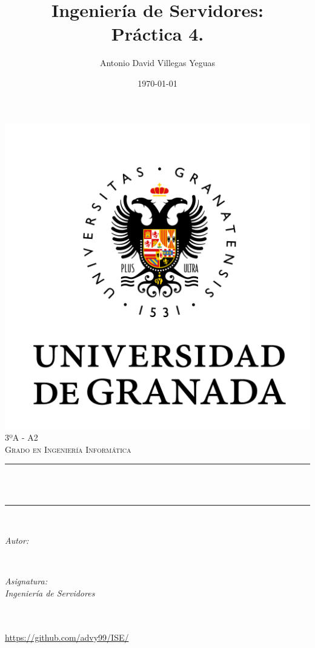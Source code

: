 \documentclass[12pt, spanish]{article}
\title{Ingeniería de Servidores:\\
Práctica 4. \hspace{0.05cm} }
\author{Antonio David Villegas Yeguas}
\date{\today}
\makeatletter
\let\thetitle\@title
\let\theauthor\@author
\let\thedate\@date
\makeatother
\begin{document}

\begin{titlepage}
    \centering
    \vspace*{0.5 cm}
    \includegraphics[scale = 0.50]{ugr.png}\\[1.0 cm]
    \textsc{\large 3ºA - A2}\\[0.5 cm]            
    \textsc{\large Grado en Ingeniería Informática}\\[0.5 cm]              
    \rule{\linewidth}{0.2 mm} \\[0.2 cm]
    { \huge \bfseries \thetitle}\\
    \rule{\linewidth}{0.2 mm} \\[1 cm]
    
    \begin{minipage}{0.4\textwidth}
        \begin{flushleft} \large
            \emph{Autor:}\\
            \theauthor
            \end{flushleft}
            \end{minipage}~
            \begin{minipage}{0.4\textwidth}
            \begin{flushright} \large
            \emph{Asignatura: \\
            Ingeniería de Servidores}                   
        \end{flushright}
    \end{minipage}\\[0.5cm]
  
    {\large \thedate}\\[0.5cm]
    {\url{https://github.com/advy99/ISE/}}
    {\doclicenseThis}
 	
    \vfill
    
\end{titlepage}
\end{document}
